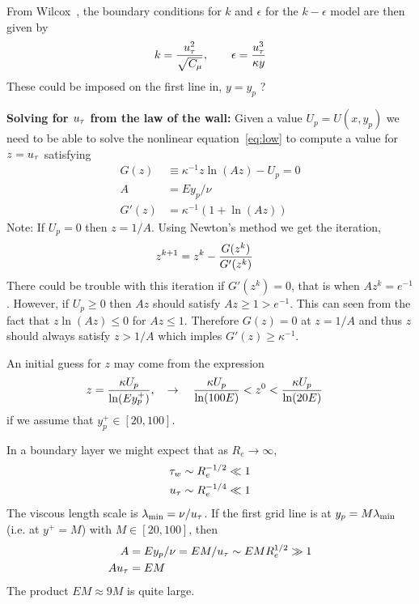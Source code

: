From Wilcox~\cite{Wilcox}, the boundary conditions for $k$ and $\epsilon$ for the $k-\epsilon$
model are then given by
\begin{align*}
  k = { u_\tau^2 \over \sqrt{C_\mu}} , \qquad \epsilon = {u_\tau^3 \over \kappa y}
\end{align*}
These could be imposed on the first line in, $y=y_p$ ? 


{\bf Solving for $u_\tau$ from the law of the wall:} Given a value $U_p=U(x,y_p)$ we need to be able to
solve the nonlinear equation~\eqref{eq:low}
to compute a value for $z=u_\tau$ satisfying 
\begin{align*}
     G(z) &\equiv \kappa^{-1} z \ln( A z) - U_p = 0  \\
     A &= E y_p/\nu \\
     G'(z) &= \kappa^{-1} ( 1 + \ln( A z) )
\end{align*}
Note: If $U_p=0$ then $z=1/A$. 
Using Newton's method we get the iteration,
\begin{align*}
     z^{k+1} &= z^k - { G(z^k) \over G'(z^k)}
\end{align*}
There could be trouble with this iteration if $G'(z^k) = 0$, that is when $A z^k = e^{-1}$. 
However, if $U_p\ge 0$ then $Az$ should satisfy $ Az \ge 1 > e^{-1}$. This can seen from the fact that
$z\ln(Az) \le 0 $ for $Az \le 1$. Therefore $G(z)=0$ at $z=1/A$ and thus $z$ should always satisfy $z>1/A$ which
imples $G'(z) \ge \kappa^{-1}$.

An initial guess for $z$ may come from the expression
\begin{align*}
     z &= {\kappa U_p \over \ln(E y_p^+)}, \quad \rightarrow \quad 
            {\kappa U_p \over \ln(100 E )} < z^0 < {\kappa U_p \over \ln(20 E)}
\end{align*}
if we assume that $y_p^+ \in [20,100]$. 


In a boundary layer we might expect that as $R_e \rightarrow \infty$,
\begin{align*}
     \tau_w &\sim R_e^{-1/2} \ll 1  \\
     u_\tau  &\sim R_e^{-1/4} \ll 1  \\
\end{align*}
The viscous length scale is $\lambda_{\rm min}=\nu/u_\tau$. 
If the first grid line is at $ y_p = M \lambda_{\rm min}$  (i.e. at $y^+ = M$) with $M \in [20,100]$, then
\begin{align*}
     A & = E y_p/\nu  = E M/u_\tau \sim E M  R_e^{1/2} \gg 1 \\
     Au_\tau &=  E M 
\end{align*}
The product $E M \approx 9 M $ is quite large.  


